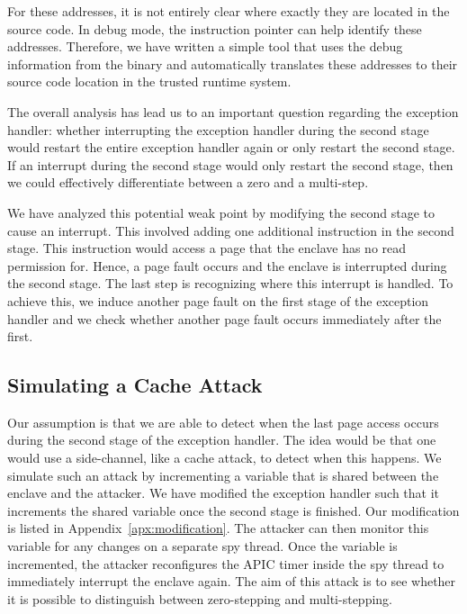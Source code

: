 \documentclass{llncs}
\begin{document}
For these addresses, it is not entirely clear where exactly they are located in
the source code.
In debug mode, the instruction pointer can help identify these addresses.
Therefore, we have written a simple tool that uses the debug information from
the binary and automatically translates these addresses to their source code
location in the trusted runtime system.

The overall analysis has lead us to an important question regarding the
exception handler:
whether interrupting the exception handler during the second stage would
restart the entire exception handler again or only restart the second stage.
If an interrupt during the second stage would only restart the second stage,
then we could effectively differentiate between a zero and a multi-step.

We have analyzed this potential weak point by modifying the second stage to
cause an interrupt.
This involved adding one additional instruction in the second stage.
This instruction would access a page that the enclave has no read permission for.
Hence, a page fault occurs and the enclave is interrupted during the second stage.
The last step is recognizing where this interrupt is handled.
To achieve this, we induce another page fault on the first stage of the exception handler
and we check whether another page fault occurs immediately after the first.

\subsection{Simulating a Cache Attack}

Our assumption is that we are able to detect when the last page access occurs
during the second stage of the exception handler.
The idea would be that one would use a side-channel, like a cache attack, to
detect when this happens.
We simulate such an attack by incrementing a variable that is shared between
the enclave and the attacker.
We have modified the exception handler such that it increments the shared
variable once the second stage is finished.
Our modification is listed in Appendix~\ref{apx:modification}.
The attacker can then monitor this variable for any changes on a separate spy thread.
Once the variable is incremented, the attacker reconfigures the APIC timer
inside the spy thread to immediately interrupt the enclave again.
The aim of this attack is to see whether it is possible to distinguish between
zero-stepping and multi-stepping.
\end{document}
